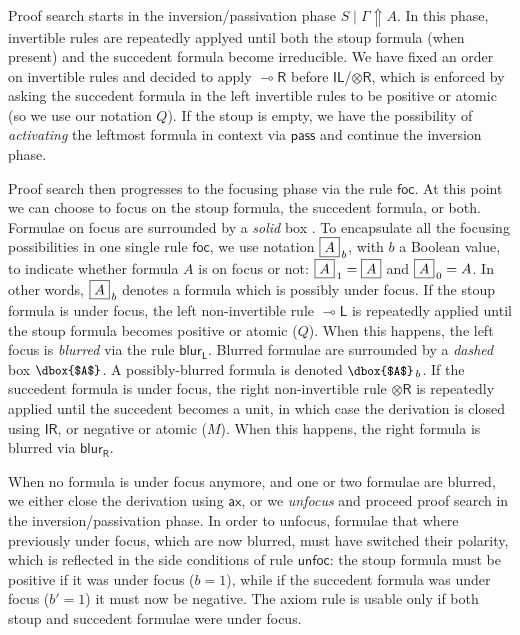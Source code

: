 \documentclass[runningheads]{llncs}
\newcommand{\tr}{\otimes \mathsf{R}}
\newcommand{\lright}{{\multimap}\mathsf{R}}
\newcommand{\lleft}{{\multimap}\mathsf{L}}
\newcommand{\pass}{\mathsf{pass}}
\newcommand{\unitl}{\mathsf{IL}}
\newcommand{\unitr}{\mathsf{IR}}
\newcommand{\otR}{\tr}
\newcommand{\lolliR}{\lright}
\newcommand{\lolliL}{\lleft}
\newcommand{\IL}{\unitl}
\newcommand{\IR}{\unitr}
\newcommand{\ax}{\mathsf{ax}}
\newcommand{\up}{\Uparrow}
\newcommand{\foc}{\mathsf{foc}}
\newcommand{\blurL}{\mathsf{blur_L}}
\newcommand{\blurR}{\mathsf{blur_R}}
\newcommand{\unfoc}{\mathsf{unfoc}}
\begin{document}
Proof search starts in the inversion/passivation phase $S \mid \Gamma \up A$. In this phase, invertible rules are repeatedly applyed until both the stoup formula (when present) and the succedent formula become irreducible. We have fixed an order on invertible rules and decided to apply $\lolliR$ before $\IL$/$\otR$, which is enforced by asking the succedent formula in the left invertible rules to be positive or atomic (so we use our notation $Q$). 
If the stoup is empty, we have the possibility of \emph{activating} the leftmost formula in context via $\pass$ and continue the inversion phase.

Proof search then progresses to the focusing phase via the rule $\foc$. At this point we can choose to focus on the stoup formula, the succedent formula, or both. Formulae on focus are surrounded by a \emph{solid} box {\small{}}. To encapsulate all the focusing possibilities in one single rule $\foc$, we use notation {\small{$\fbox{$A$}_{\,b}$}}, with $b$ a Boolean value, to indicate whether formula $A$ is on focus or not: {\small{$\fbox{$A$}_{\,1} = \fbox{$A$}$}} and {\small{$\fbox{$A$}_{\,0} = A$}}. In other words, {\small{$\fbox{$A$}_{\,b}$}} denotes a formula which is possibly under focus. If the stoup formula is under focus, the left non-invertible rule $\lolliL$ is repeatedly applied until the stoup formula becomes positive or atomic ($Q$). When this happens, the left focus is \emph{blurred} via the rule $\blurL$. Blurred formulae are surrounded by a \emph{dashed} box ${\small{\dbox{$A$}}}$. A possibly-blurred formula is denoted ${\small{\dbox{$A$}_{\,b}}}$. If the succedent formula is under focus, the right non-invertible rule $\otR$ is repeatedly applied until the succedent becomes a unit, in which case the derivation is closed using $\IR$, or negative or atomic ($M$). When this happens, the right formula is blurred via $\blurR$.

When no formula is under focus anymore, and one or two formulae are blurred, we either close the derivation using $\ax$, or we \emph{unfocus} and proceed proof search in the inversion/passivation phase. In order to unfocus, formulae that where previously under focus, which are now blurred, must have switched their polarity, which is reflected in the side conditions of rule $\unfoc$: the stoup formula must be positive if it was under focus ($b=1$), while if the succedent formula was under focus ($b' = 1$) it must now be negative. The axiom rule is usable only if both stoup and succedent formulae were under focus.
\end{document}
